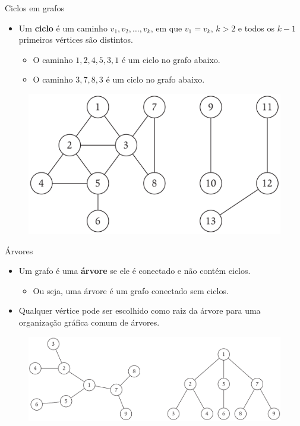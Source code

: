 \begin{frame}{Ciclos em grafos}
	
	\begin{itemize}
		\item Um \textbf{\color{magenta}ciclo} é um caminho $v_1, v_2, \dots, v_k$, em que $v_1 = v_k$, $k > 2$ e todos os $k - 1$ primeiros vértices são distintos.
		\begin{itemize}
			\item O caminho $1, 2, 4, 5, 3, 1$ é um ciclo no grafo abaixo.
			\item O caminho $3, 7, 8, 3$ é um ciclo no grafo abaixo.
		\end{itemize}
	\end{itemize}

	\begin{figure}
		\centering
		\includegraphics[width=0.375\linewidth,trim={0 0 15cm 0},clip]{img/conectividade}
	\end{figure}
\end{frame}



\begin{frame}{Árvores}

	\begin{itemize}
		\item Um grafo é uma \textbf{\color{magenta}árvore} se ele é conectado e não contém ciclos.
		\begin{itemize}
			\item Ou seja, uma árvore é um grafo conectado sem ciclos.
		\end{itemize}
		\item Qualquer vértice pode ser escolhido como raiz da árvore para uma organização gráfica comum de árvores.
	\end{itemize}

	\begin{figure}
		\centering
		\includegraphics[width=0.85\linewidth]{img/arvores}
	\end{figure}
\end{frame}



